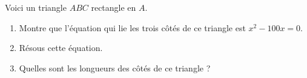 %
%
    Voici un triangle $ABC$ rectangle en $A$.
    \begin{center}
        
    \end{center}
    \begin{enumerate}
        \item %
         Montre que l'équation qui lie les trois côtés de ce triangle est $x^2-100x = 0$.
        \item %
        Résous cette équation.
        \item %
        Quelles sont les longueurs des côtés de ce triangle ?
    \end{enumerate}
